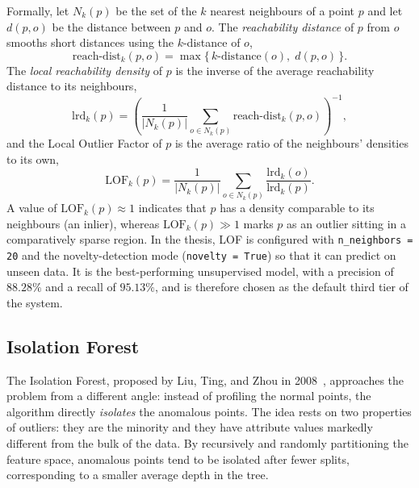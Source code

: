 \documentclass[../main.tex]{subfiles}
\begin{document}
Formally, let $N_k(p)$ be the set of the $k$ nearest neighbours of a point
$p$ and let $d(p,o)$ be the distance between $p$ and $o$. The
\emph{reachability distance} of $p$ from $o$ smooths short distances using
the $k$-distance of $o$,
\begin{equation}
  \text{reach-dist}_k(p,o) = \max\{\, k\text{-distance}(o),\; d(p,o) \,\}.
  \label{eq:reachdist}
\end{equation}
The \emph{local reachability density} of $p$ is the inverse of the average
reachability distance to its neighbours,
\begin{equation}
  \text{lrd}_k(p) = \left( \frac{1}{|N_k(p)|}
  \sum_{o \in N_k(p)} \text{reach-dist}_k(p,o) \right)^{-1},
  \label{eq:lrd}
\end{equation}
and the Local Outlier Factor of $p$ is the average ratio of the neighbours'
densities to its own,
\begin{equation}
  \text{LOF}_k(p) = \frac{1}{|N_k(p)|}
  \sum_{o \in N_k(p)} \frac{\text{lrd}_k(o)}{\text{lrd}_k(p)} .
  \label{eq:lof}
\end{equation}
A value of $\text{LOF}_k(p) \approx 1$ indicates that $p$ has a density
comparable to its neighbours (an inlier), whereas $\text{LOF}_k(p) \gg 1$
marks $p$ as an outlier sitting in a comparatively sparse region. In the
thesis, LOF is
configured with \texttt{n\_neighbors = 20} and the novelty-detection mode
(\texttt{novelty = True}) so that it can predict on unseen data. It is the
best-performing unsupervised model, with a precision of $88.28\%$ and a
recall of $95.13\%$, and is therefore chosen as the default third tier of
the system.

\subsection{Isolation Forest}

The Isolation Forest, proposed by Liu, Ting, and Zhou in
2008~\cite{liu2008}, approaches the problem from a different angle: instead
of profiling the normal points, the algorithm directly \emph{isolates} the
anomalous points. The idea rests on two properties of outliers: they are
the minority and they have attribute values markedly different from the
bulk of the data. By recursively and randomly partitioning the feature
space, anomalous points tend to be isolated after fewer splits,
corresponding to a smaller average depth in the tree.
\end{document}
